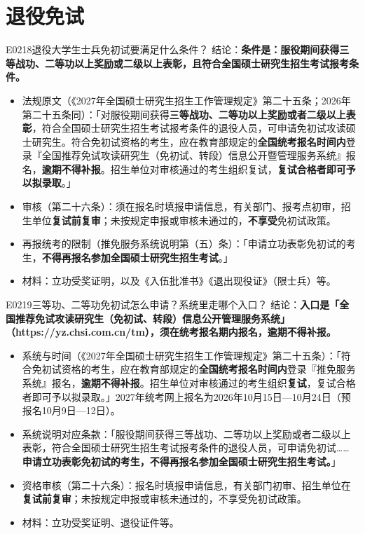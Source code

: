 \section{退役免试}
\begin{qa}{E0218}{退役大学生士兵免初试要满足什么条件？}
结论：\textbf{条件是：服役期间获得三等战功、二等功以上奖励或二级以上表彰，且符合全国硕士研究生招生考试报考条件。}
\begin{itemize}
  \item 法规原文（《2027年全国硕士研究生招生工作管理规定》第二十五条；2026年第二十五条同）：「对服役期间获得\textbf{三等战功、二等功以上奖励或者二级以上表彰}，符合全国硕士研究生招生考试报考条件的退役人员，可申请免初试攻读硕士研究生。符合免初试资格的考生，应在教育部规定的\textbf{全国统考报名时间内}登录『全国推荐免试攻读研究生（免初试、转段）信息公开暨管理服务系统』报名，\textbf{逾期不得补报}。招生单位对审核通过的考生组织复试，\textbf{复试合格者即可予以拟录取}。」
  \item 审核（第二十六条）：须在报名时填报申请信息，有关部门、报考点初审，招生单位\textbf{复试前复审}；未按规定申报或审核未通过的，\textbf{不享受}免初试政策。
  \item 再报统考的限制（推免服务系统说明第（五）条）：「申请立功表彰免初试的考生，\textbf{不得再报名参加全国硕士研究生招生考试}。」
  \item 材料：立功受奖证明，以及《入伍批准书》《退出现役证》（限士兵）等。
\end{itemize}
\end{qa}

\begin{qa}{E0219}{三等功、二等功免初试怎么申请？系统里走哪个入口？}
结论：\textbf{入口是「全国推荐免试攻读研究生（免初试、转段）信息公开管理服务系统」（https://yz.chsi.com.cn/tm），须在统考报名期内报名，逾期不得补报。}
\begin{itemize}
  \item 系统与时间（《2027年全国硕士研究生招生工作管理规定》第二十五条）：「符合免初试资格的考生，应在教育部规定的\textbf{全国统考报名时间内}登录『推免服务系统』报名，\textbf{逾期不得补报}。招生单位对审核通过的考生组织\textbf{复试}，复试合格者即可予以拟录取。」2027年统考网上报名为2026年10月15日—10月24日（预报名10月9日—12日）。
  \item 系统说明对应条款：「服役期间获得三等战功、二等功以上奖励或者二级以上表彰，符合全国硕士研究生招生考试报考条件的退役人员，可申请免初试……\textbf{申请立功表彰免初试的考生，不得再报名参加全国硕士研究生招生考试。}」
  \item 资格审核（第二十六条）：报名时填报申请信息，有关部门初审、招生单位在\textbf{复试前复审}；未按规定申报或审核未通过的，不享受免初试政策。
  \item 材料：立功受奖证明、退役证件等。
\end{itemize}
\end{qa}

